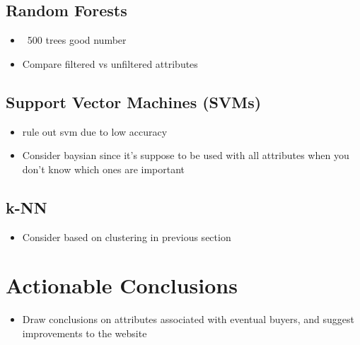 \documentclass[
  draft,
]{memreport}
\begin{document}
  \section{Random Forests}
  \begin{itemize}
    \item ~500 trees good number
    \item Compare filtered vs unfiltered attributes
  \end{itemize}

  \section{Support Vector Machines (SVMs)}
  \begin{itemize}
    \item rule out svm due to low accuracy
    \item Consider baysian since it's suppose to be used with all attributes when you don't know which ones are important
  \end{itemize}

  \section{k-NN}
  \begin{itemize}
    \item Consider based on clustering in previous section
  \end{itemize}

  \chapter{Actionable Conclusions}
  \begin{itemize}
    \item Draw conclusions on attributes associated with eventual buyers, and suggest improvements to the website
  \end{itemize}

  \backmatter{}
\end{document}
